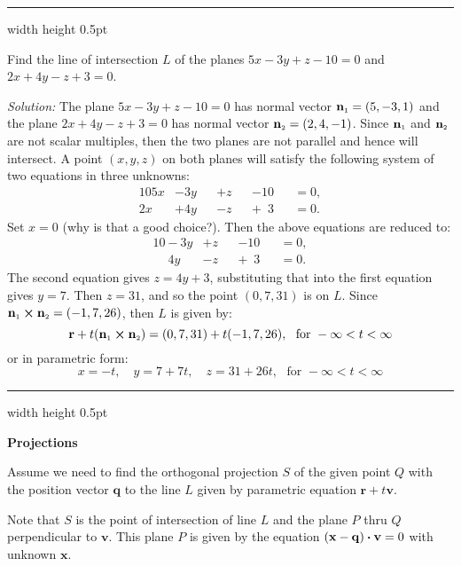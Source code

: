 \medskip
\hrule width \textwidth height 0.5pt
\begin{exmp}\label{exmp:planeinter}
 Find the line of intersection $L$ of the planes $5x - 3y + z - 10 = 0$ and $2x + 4y - z + 3 = 0$.
 \smallskip
 \par\noindent\emph{Solution:} The plane $5x - 3y + z - 10 = 0$ has normal vector $\mathbf{n}_{\scriptscriptstyle 1} = (5,-3,1)$ and
 the plane $2x + 4y - z + 3 = 0$ has normal vector $\mathbf{n}_{\scriptscriptstyle 2} = (2,4,-1)$. Since $\mathbf{n}_{\scriptscriptstyle 1}$ and
 $\mathbf{n}_{\scriptscriptstyle 2}$ are not scalar multiples, then the two planes are not parallel and hence will intersect. A
 point $(x,y,z)$ on both planes will satisfy the following system of two equations in three unknowns:
 \begin{alignat*}{10}
  5x &- 3y &&+ z &&- 10 &&= 0,\\
  2x &+ 4y &&- z &&+ \phantom{1}3 &&= 0.
 \end{alignat*}
 Set $x = 0$ (why is that a good choice?). Then the above equations are reduced to:
 \begin{alignat*}{10}
  -3y &+ z &&- 10 &&= 0,\\
  \phantom{-}4y &- z &&+ \phantom{1}3 &&= 0.
 \end{alignat*}
 The second equation gives $z = 4y + 3$, substituting that into the first equation gives $y = 7$. Then $z = 31$,
 and so the point $(0,7,31)$ is on $L$. Since $\mathbf{n}_{\scriptscriptstyle 1} \bm{\times} \mathbf{n}_{\scriptscriptstyle 2} = (-1,7,26)$,
 then $L$ is given by:
 \begin{displaymath}
  \mathbf{r} + t(\mathbf{n}_{\scriptscriptstyle 1} \bm{\times} \mathbf{n}_{\scriptscriptstyle 2}) = (0,7,31) + t(-1,7,26), \text{~~for~}
  -\infty < t < \infty
 \end{displaymath}
 or in parametric form:
 \begin{displaymath}
  x = -t, \quad y = 7 + 7t, \quad z = 31 +26t, \text{~~for~} -\infty < t < \infty
 \end{displaymath} 
\end{exmp}
\hrule width \textwidth height 0.5pt


\medskip
\par\noindent\textbf{\large{Projections}}\normalsize
\smallskip

Assume we need to find the orthogonal projection $S$ of the given point $Q$ with the position vector $\mathbf{q}$ to the line $L$ given by parametric equation $\mathbf{r}+t\mathbf{v}$.

Note that $S$ is the point of intersection of line $L$ and the plane $P$ thru $Q$ perpendicular to $\mathbf{v}$.
This plane $P$ is given by the equation $(\mathbf{x}-\mathbf{q}) \bm{\cdot} \mathbf{v}=0$ with unknown $\mathbf{x}$.

